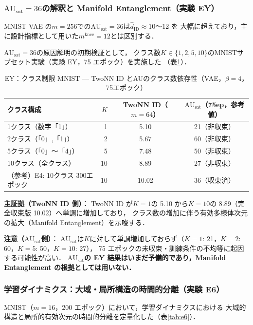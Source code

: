 \documentclass[11pt,a4paper]{jsarticle}
\newcommand{\AUsat}{\mathrm{AU}_{\mathrm{sat}}}
\newcommand{\mknee}{m^{\mathrm{knee}}}
\begin{document}
\subsubsection{$\AUsat = 36$の解釈と Manifold Entanglement（実験 EY）}

MNIST VAE の$m = 256$での$\AUsat = 36$は$\hat{d}_\mathrm{ID} \approx 10$〜12 を
大幅に超えており，主に設計指標として用いた$\mknee = 12$とは区別する．

$\AUsat = 36$の原因解明の初期検証として，
クラス数$K \in \{1, 2, 5, 10\}$のMNISTサブセット実験（実験 EY，75 エポック）を実施した
（表\ref{tab:ey}）．

\begin{table}[H]
\centering
\caption{EY：クラス制限 MNIST — TwoNN ID とAUのクラス数依存性（VAE，$\beta=4$，75エポック）}
\label{tab:ey}
\small
\begin{tabular}{lrcc}
\toprule
クラス構成 & $K$ & TwoNN ID（$m=64$） & $\AUsat$（75ep，参考値） \\
\midrule
1クラス（数字「1」） & 1  & 5.10 & 21（非収束） \\
2クラス（「0」,「1」） & 2  & 5.67 & 60（非収束） \\
5クラス（「0」〜「4」）& 5  & 7.48 & 50（非収束） \\
10クラス（全クラス）  & 10 & 8.89 & 27（非収束） \\
\midrule
（参考）E4: 10クラス 300エポック & 10 & 10.02 & 36（収束済） \\
\bottomrule
\end{tabular}
\end{table}

\textbf{主証拠（TwoNN ID 側）}：
TwoNN ID が$K = 1$の 5.10 から$K = 10$の 8.89（完全収束版 10.02）へ単調に増加しており，
クラス数の増加に伴う有効多様体次元の拡大（Manifold Entanglement）を示唆する．

\textbf{注意（$\AUsat$側）}：
$\AUsat$は$K$に対して単調増加しておらず（$K=1$: 21，$K=2$: 60，$K=5$: 50，$K=10$: 27），
75 エポックの未収束・訓練条件の不均等に起因する可能性が高い．
\textbf{$\AUsat$の EY 結果はいまだ予備的であり，Manifold Entanglement の根拠としては用いない．}

\subsubsection{学習ダイナミクス：大域・局所構造の時間的分離（実験 E6）}

MNIST（$m = 16$，200 エポック）において，学習ダイナミクスにおける
大域的構造と局所的有効次元の時間的分離を定量化した（表\ref{tab:e6}）．
\end{document}
